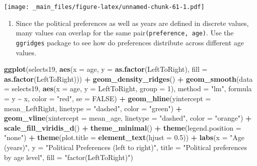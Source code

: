 \documentclass[
]{book}
\newenvironment{Shaded}{\begin{snugshade}}{\end{snugshade}}
\newcommand{\AttributeTok}[1]{\textcolor[rgb]{0.13,0.29,0.53}{#1}}
\newcommand{\ConstantTok}[1]{\textcolor[rgb]{0.56,0.35,0.01}{#1}}
\newcommand{\DecValTok}[1]{\textcolor[rgb]{0.00,0.00,0.81}{#1}}
\newcommand{\FloatTok}[1]{\textcolor[rgb]{0.00,0.00,0.81}{#1}}
\newcommand{\FunctionTok}[1]{\textcolor[rgb]{0.13,0.29,0.53}{\textbf{#1}}}
\newcommand{\NormalTok}[1]{#1}
\newcommand{\SpecialCharTok}[1]{\textcolor[rgb]{0.81,0.36,0.00}{\textbf{#1}}}
\newcommand{\StringTok}[1]{\textcolor[rgb]{0.31,0.60,0.02}{#1}}
\providecommand{\tightlist}{%
  \setlength{\itemsep}{0pt}\setlength{\parskip}{0pt}}
\begin{document}
\texttt{[image: \_main\_files/figure-latex/unnamed-chunk-61-1.pdf]}

\begin{enumerate}
\def\labelenumi{\arabic{enumi}.}
\setcounter{enumi}{1}
\tightlist
\item
  Since the political preferences as well as years are defined in discrete values, many values can overlap for the same pair\texttt{(preference,\ age)}. Use the \texttt{ggridges} package to see how do preferences distribute across different age values.
\end{enumerate}

\begin{Shaded}
\begin{Highlighting}[]
\FunctionTok{ggplot}\NormalTok{(selects19, }\FunctionTok{aes}\NormalTok{(}\AttributeTok{x =}\NormalTok{ age, }\AttributeTok{y =} \FunctionTok{as.factor}\NormalTok{(LeftToRight), }\AttributeTok{fill =} \FunctionTok{as.factor}\NormalTok{(LeftToRight))) }\SpecialCharTok{+}
  \FunctionTok{geom\_density\_ridges}\NormalTok{() }\SpecialCharTok{+}
  \FunctionTok{geom\_smooth}\NormalTok{(}\AttributeTok{data =}\NormalTok{ selects19, }\FunctionTok{aes}\NormalTok{(}\AttributeTok{x =}\NormalTok{ age, }\AttributeTok{y =}\NormalTok{ LeftToRight, }\AttributeTok{group =} \DecValTok{1}\NormalTok{), }
              \AttributeTok{method =} \StringTok{"lm"}\NormalTok{, }\AttributeTok{formula =}\NormalTok{ y }\SpecialCharTok{\textasciitilde{}}\NormalTok{ x, }\AttributeTok{color =} \StringTok{"red"}\NormalTok{, }\AttributeTok{se =} \ConstantTok{FALSE}\NormalTok{) }\SpecialCharTok{+}
  \FunctionTok{geom\_hline}\NormalTok{(}\AttributeTok{yintercept =}\NormalTok{ mean\_LeftRight, }\AttributeTok{linetype =} \StringTok{"dashed"}\NormalTok{, }\AttributeTok{color =} \StringTok{"green"}\NormalTok{) }\SpecialCharTok{+}
  \FunctionTok{geom\_vline}\NormalTok{(}\AttributeTok{xintercept =}\NormalTok{ mean\_age, }\AttributeTok{linetype =} \StringTok{"dashed"}\NormalTok{, }\AttributeTok{color =} \StringTok{"orange"}\NormalTok{) }\SpecialCharTok{+}
  \FunctionTok{scale\_fill\_viridis\_d}\NormalTok{() }\SpecialCharTok{+}
  \FunctionTok{theme\_minimal}\NormalTok{() }\SpecialCharTok{+}
  \FunctionTok{theme}\NormalTok{(}\AttributeTok{legend.position =} \StringTok{"none"}\NormalTok{) }\SpecialCharTok{+}
  \FunctionTok{theme}\NormalTok{(}\AttributeTok{plot.title =} \FunctionTok{element\_text}\NormalTok{(}\AttributeTok{hjust =} \FloatTok{0.5}\NormalTok{)) }\SpecialCharTok{+}
  \FunctionTok{labs}\NormalTok{(}\AttributeTok{x =} \StringTok{"Age (years)"}\NormalTok{,}
       \AttributeTok{y =} \StringTok{"Political Preferences (left to right)"}\NormalTok{,}
       \AttributeTok{title =} \StringTok{"Political preferences by age level"}\NormalTok{,}
       \AttributeTok{fill =} \StringTok{"factor(LeftToRight)"}\NormalTok{)}
\end{Highlighting}
\end{Shaded}
\end{document}
